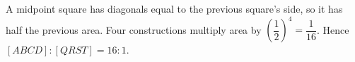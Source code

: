 A midpoint square has diagonals equal to the previous square's side, so it has half the previous area. Four constructions multiply area by $(\dfrac{1}{2})^4=\dfrac{1}{16}$. Hence $\boxed{[ABCD]:[QRST]=16:1}$.
